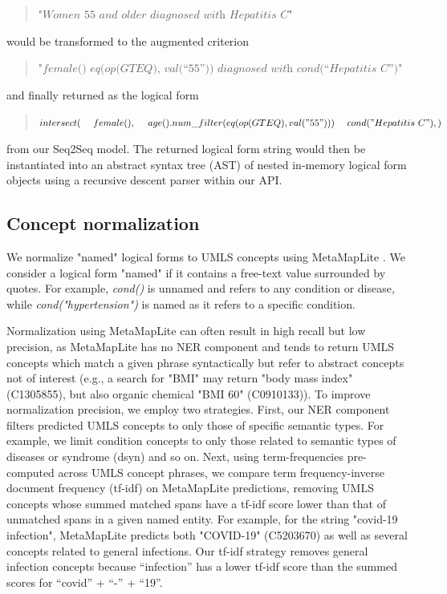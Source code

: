 \documentclass[../main.tex]{subfiles}
\begin{document}
\begin{quote}
    $\textit{"Women 55 and older diagnosed with Hepatitis C"}$
\end{quote}

\noindent would be transformed to the augmented criterion

\begin{quote}
    $\textit{"female() eq(op(GTEQ), val(“55”)) diagnosed with cond(“Hepatitis C”)"}$
\end{quote}

\noindent and finally returned as the logical form

\begin{quote}
$intersect( \\
    \mathrm{\ \ \ \ }female(),\\
    \mathrm{\ \ \ \ }age().num\_filter(eq(op(GTEQ), val("55"))) \\
    \mathrm{\ \ \ \ }cond("Hepatitis\mathrm{\ }C"), \\
)$
\end{quote}

\noindent from our Seq2Seq model. The returned logical form string would then be instantiated into an abstract syntax tree (AST) of nested in-memory logical form objects using a recursive descent parser \cite{johnstone1998generalised} within our API.

\subsection{Concept normalization}

We normalize "named" logical forms to UMLS concepts using MetaMapLite \cite{aronson2001effective, demner2017metamap}. We consider a logical form "named" if it contains a free-text value surrounded by quotes. For example, \textit{cond()} is unnamed and refers to any condition or disease, while \textit{cond("hypertension")} is named as it refers to a specific condition. 

Normalization using MetaMapLite can often result in high recall but low precision, as MetaMapLite has no NER component and tends to return UMLS concepts which match a given phrase syntactically but refer to abstract concepts not of interest (e.g., a search for "BMI" may return "body mass index" (C1305855), but also organic chemical "BMI 60" (C0910133)). To improve normalization precision, we employ two strategies. First, our NER component filters predicted UMLS concepts to only those of specific semantic types. For example, we limit condition concepts to only those related to semantic types of diseases or syndrome (dsyn) and so on. Next, using term-frequencies pre-computed across UMLS concept phrases, we compare term frequency-inverse document frequency (tf-idf) on MetaMapLite predictions, removing UMLS concepts whose summed matched spans have a tf-idf score lower than that of unmatched spans in a given named entity. For example, for the string "covid-19 infection", MetaMapLite predicts both "COVID-19" (C5203670) as well as several concepts related to general infections. Our tf-idf strategy removes general infection concepts because “infection” has a lower tf-idf score than the summed scores for “covid” + “-” + “19”. 
\end{document}
